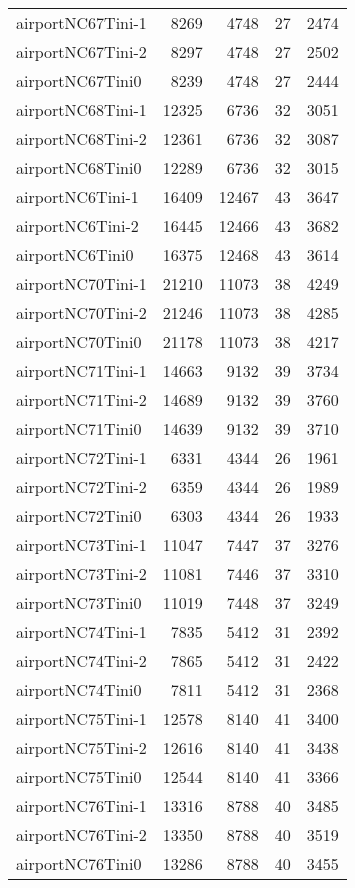 \begin{longtable}{lrrrr}
airportNC67Tini-1 & 8269 & 4748 & 27 & 2474 \\
airportNC67Tini-2 & 8297 & 4748 & 27 & 2502 \\
airportNC67Tini0 & 8239 & 4748 & 27 & 2444 \\
airportNC68Tini-1 & 12325 & 6736 & 32 & 3051 \\
airportNC68Tini-2 & 12361 & 6736 & 32 & 3087 \\
airportNC68Tini0 & 12289 & 6736 & 32 & 3015 \\
airportNC6Tini-1 & 16409 & 12467 & 43 & 3647 \\
airportNC6Tini-2 & 16445 & 12466 & 43 & 3682 \\
airportNC6Tini0 & 16375 & 12468 & 43 & 3614 \\
airportNC70Tini-1 & 21210 & 11073 & 38 & 4249 \\
airportNC70Tini-2 & 21246 & 11073 & 38 & 4285 \\
airportNC70Tini0 & 21178 & 11073 & 38 & 4217 \\
airportNC71Tini-1 & 14663 & 9132 & 39 & 3734 \\
airportNC71Tini-2 & 14689 & 9132 & 39 & 3760 \\
airportNC71Tini0 & 14639 & 9132 & 39 & 3710 \\
airportNC72Tini-1 & 6331 & 4344 & 26 & 1961 \\
airportNC72Tini-2 & 6359 & 4344 & 26 & 1989 \\
airportNC72Tini0 & 6303 & 4344 & 26 & 1933 \\
airportNC73Tini-1 & 11047 & 7447 & 37 & 3276 \\
airportNC73Tini-2 & 11081 & 7446 & 37 & 3310 \\
airportNC73Tini0 & 11019 & 7448 & 37 & 3249 \\
airportNC74Tini-1 & 7835 & 5412 & 31 & 2392 \\
airportNC74Tini-2 & 7865 & 5412 & 31 & 2422 \\
airportNC74Tini0 & 7811 & 5412 & 31 & 2368 \\
airportNC75Tini-1 & 12578 & 8140 & 41 & 3400 \\
airportNC75Tini-2 & 12616 & 8140 & 41 & 3438 \\
airportNC75Tini0 & 12544 & 8140 & 41 & 3366 \\
airportNC76Tini-1 & 13316 & 8788 & 40 & 3485 \\
airportNC76Tini-2 & 13350 & 8788 & 40 & 3519 \\
airportNC76Tini0 & 13286 & 8788 & 40 & 3455 \\

\end{longtable}
